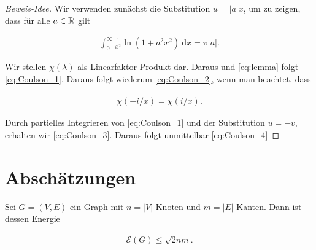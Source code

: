         \begin{proof}[Beweis-Idee]

            Wir verwenden zunächst die Substitution $u = |a| x$, um zu zeigen, dass für alle $a \in \mathbb R$ gilt

            \begin{align} \label{eq:lemma}
                \int_0^\infty
                    \frac{1}{x^2}
                    \ln(1 + a^2 x^2)
                    ~ \mathrm d x
                =
                \pi |a|.
            \end{align}

            Wir stellen $\chi(\lambda)$ als Linearfaktor-Produkt dar.
            Daraus und \eqref{eq:lemma} folgt \eqref{eq:Coulson_1}.
            Daraus folgt wiederum \eqref{eq:Coulson_2}, wenn man beachtet, dass

            \begin{align*}
                \chi(-i/x) = \overline{\chi(i/x)}.
            \end{align*}

            Durch partielles Integrieren von \eqref{eq:Coulson_1} und der Substitution $u = -v$, erhalten wir \eqref{eq:Coulson_3}.
            Daraus folgt unmittelbar \eqref{eq:Coulson_4}

        \end{proof}


    \section{Abschätzungen}

        \begin{theorem}

            Sei $G = (V, E)$ ein Graph mit $n = |V|$ Knoten und $m = |E|$ Kanten.
            Dann ist dessen Energie

            \begin{align*}
                \mathcal E(G)
                \leq
                \sqrt{2 n m}.
            \end{align*}

        \end{theorem}

